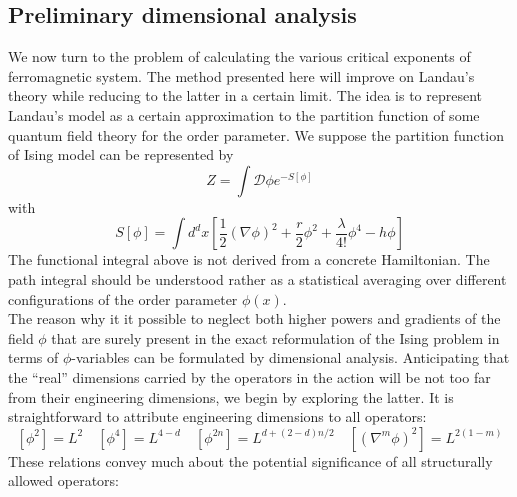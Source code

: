 \subsection{Preliminary dimensional analysis}
We now turn to the problem of calculating the various critical exponents of ferromagnetic system. The method presented here will improve on Landau's theory while reducing to the latter in a certain limit. The idea is to represent Landau's model as a certain approximation to the partition function of some quantum field theory for the order parameter. 
We suppose the partition function of Ising model can be represented by
\[Z = \int \mathcal{D}\phi e^{-S[\phi]}\]
with 
\[S[\phi] = \int d^d x \left[\frac{1}{2}(\nabla \phi)^2 + \frac{r}{2}\phi^2 + \frac{\lambda}{4!}\phi^4 - h\phi \right]\]
The functional integral above is not derived from a concrete Hamiltonian. The path integral should be understood rather as a statistical averaging over different configurations of the order parameter $\phi(x)$. 
\\
The reason why it it possible to neglect both higher powers and gradients of the field $\phi$ that are surely present in the exact reformulation of the Ising problem in terms of $\phi$-variables can be formulated by dimensional analysis.
Anticipating that the ``real'' dimensions carried by the operators in the action will be not too far from their
engineering dimensions, we begin by exploring the latter. 
It is straightforward to attribute engineering dimensions to all operators:
\[\left[\phi^2 \right] = L^2 \quad \left[\phi^4 \right] = L^{4-d} \quad \left[\phi^{2n} \right] = L^{d + (2-d)n/2} \quad  \left[(\nabla^m \phi)^2 \right] = L^{2(1-m)}\]
These relations convey much about the potential significance of all structurally allowed operators:
